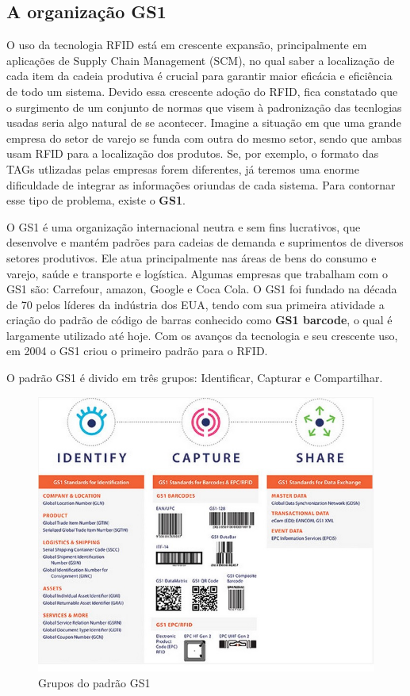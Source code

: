 

%

\subsection{A organização GS1}	
	O uso da tecnologia RFID está em crescente expansão, principalmente em aplicações de Supply Chain Management (SCM), no qual saber a localização de cada item da cadeia produtiva é crucial para garantir maior eficácia e eficiência de todo um sistema. Devido essa crescente adoção do RFID, fica constatado que o surgimento de um conjunto de normas que visem à padronização das tecnlogias usadas seria algo natural de se acontecer. Imagine a situação em que uma grande empresa do setor de varejo se funda com outra do mesmo setor, sendo que ambas usam RFID para a localização dos produtos. Se, por exemplo, o formato das TAGs utlizadas pelas empresas forem diferentes, já teremos uma enorme dificuldade de integrar as informações oriundas de cada sistema. Para contornar esse tipo de problema, existe o \textbf{GS1}.
	
	O GS1 é uma organização internacional neutra e sem fins lucrativos, que desenvolve e mantém padrões para cadeias de demanda e suprimentos de diversos setores produtivos. Ele atua principalmente nas áreas de bens do consumo e varejo, saúde e transporte e logística. Algumas empresas que trabalham com o GS1 são: Carrefour, amazon, Google e Coca Cola. 	
	O GS1 foi fundado na década de 70 pelos líderes da indústria dos EUA, tendo com sua primeira atividade a criação do padrão de código de barras conhecido como \textbf{GS1 barcode}, o qual é largamente utilizado até hoje. Com os avanços da tecnologia e seu crescente uso, em 2004 o GS1 criou o primeiro padrão para o RFID.

	O padrão GS1 é divido em três grupos: Identificar, Capturar e Compartilhar. 
	\begin{figure}[h!]
		\centering
		\includegraphics[width=0.7\linewidth]{gs1arch}
		\caption{Grupos do padrão GS1}
		\label{fig:gs1arch}
	\end{figure}

